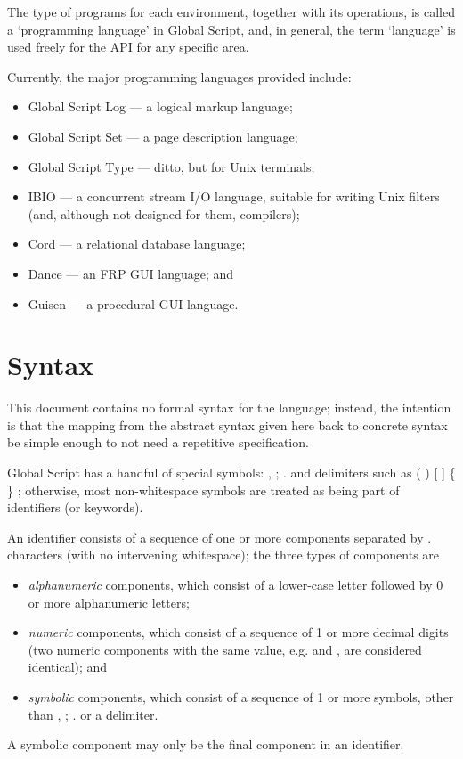 \documentclass{report}
\newcommand\defn[1]{\emph{#1}}
\begin{document}
The type of programs for each environment, together with its operations,
is called a `programming language' in Global Script,
and, in general, the term `language' is used freely for the API for any specific area.

Currently, the major programming languages provided include:
\begin{itemize}
    \item Global Script Log --- a logical markup language;
    \item Global Script Set --- a page description language;
    \item Global Script Type --- ditto, but for Unix terminals;
    \item IBIO --- a concurrent stream I/O language, suitable for writing Unix filters (and, although not designed for them, compilers);
    \item Cord --- a relational database language;
    \item Dance --- an FRP GUI language; and
    \item Guisen --- a procedural GUI language.
\end{itemize}

\section{Syntax}

This document contains no formal syntax for the language;
instead, the intention is that the mapping from the abstract syntax given here back to concrete syntax be simple enough to not need a repetitive specification.

Global Script has a handful of special symbols: \<, ; .\> and delimiters such as \<( ) [ ] \{ \} \langle \rangle \llangle \rrangle\>;
otherwise, most non-whitespace symbols are treated as being part of identifiers (or keywords).

An identifier consists of a sequence of one or more components separated by \<.\> characters (with no intervening whitespace);
the three types of components are
\begin{itemize}
  \item \defn{alphanumeric} components, which consist of a lower-case letter followed by 0 or more alphanumeric letters;
  \item \defn{numeric} components, which consist of a sequence of 1 or more decimal digits (two numeric components with the same value, e.g. \> and \>, are considered identical); and
  \item \defn{symbolic} components, which consist of a sequence of 1 or more symbols, other than \<, ; .\> or a delimiter.
\end{itemize}
A symbolic component may only be the final component in an identifier.
\end{document}
